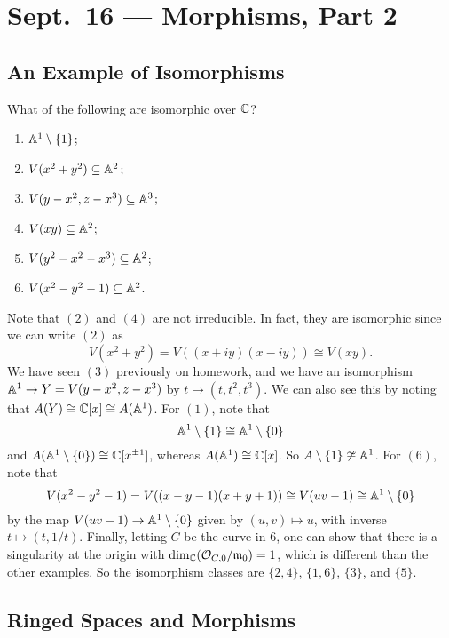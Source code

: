 \chapter{Sept.~16 --- Morphisms, Part 2}

\section{An Example of Isomorphisms}
\begin{example}\label{ex:isomorphism}
  What of the following are isomorphic
  over $\mathbb{C}$?
  \begin{enumerate}
    \item $\mathbb{A}^1 \setminus \{1\}$;
    \item $V(x^2 + y^2) \subseteq \mathbb{A}^2$;
    \item $V(y - x^2, z - x^3) \subseteq \mathbb{A}^3$;
    \item $V(xy) \subseteq \mathbb{A}^2$;
    \item $V(y^2 - x^2 - x^3) \subseteq \mathbb{A}^2$;
    \item $V(x^2 - y^2 - 1) \subseteq \mathbb{A}^2$.
  \end{enumerate}
  Note that $(2)$ and $(4)$ are not
  irreducible. In fact, they are isomorphic
  since we can write $(2)$ as
  \[
    V(x^2 + y^2)
    = V((x + iy)(x - iy))
    \cong V(xy).
  \]
  We have seen $(3)$ previously on
  homework, and we have an isomorphism
  $\mathbb{A}^1 \to Y = V(y - x^2, z - x^3)$
  by $t \mapsto (t, t^2, t^3)$.
  We can also see this by noting that
  $A(Y) \cong \mathbb{C}[x] \cong A(\mathbb{A}^1)$.
  For $(1)$, note that
  \[
    \mathbb{A}^1 \setminus \{1\}
    \cong \mathbb{A}^1 \setminus \{0\}
  \]
  and $A(\mathbb{A}^1 \setminus \{0\}) \cong \mathbb{C}[x^{\pm 1}]$,
  whereas $A(\mathbb{A}^1) \cong \mathbb{C}[x]$.
  So $A \setminus \{1\} \ncong \mathbb{A}^1$.
  For $(6)$, note that
  \[
    V(x^2 - y^2 - 1)
    = V((x - y - 1)(x + y + 1))
    \cong V(uv - 1)
    \cong \mathbb{A}^1 \setminus \{0\}
  \]
  by the map
  $V(uv - 1) \to \mathbb{A}^1 \setminus \{0\}$
  given by $(u, v) \mapsto u$,
  with inverse $t \mapsto (t, 1 / t)$.
  Finally, letting $C$ be the curve in
  $6$, one can show that there is
  a singularity at the origin with
  $\dim_{\mathbb{C}} (\mathcal{O}_{C, 0} / \mathfrak{m}_0) = 1$,
  which is different than the other examples.
  So the isomorphism classes are
  $\{2, 4\}$, $\{1, 6\}$, $\{3\}$, and $\{5\}$.
\end{example}

\section{Ringed Spaces and Morphisms}

